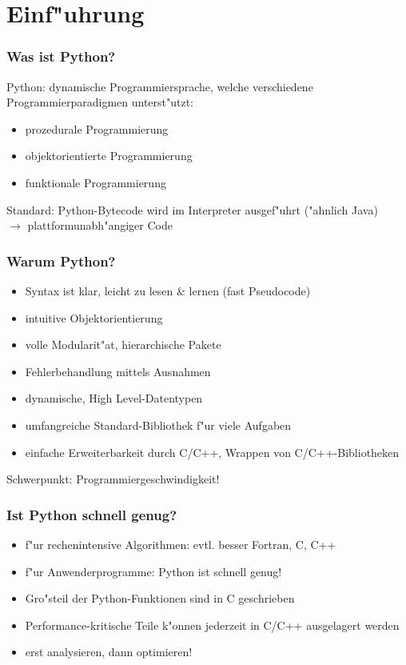 \section{Einf"uhrung}

\begin{frame}
\frametitle{Was ist Python?}
\alert{Python:} dynamische Programmiersprache, welche verschiedene Programmierparadigmen unterst"utzt:
\begin{itemize}
\item prozedurale Programmierung
\item objektorientierte Programmierung
\item funktionale Programmierung
\end{itemize}
Standard: Python-Bytecode wird im Interpreter ausgef"uhrt ("ahnlich Java)\\
$\rightarrow$ \alert{plattformunabh"angiger Code}
\end{frame}

\begin{frame}
\frametitle{Warum Python?}
\begin{itemize}
\item Syntax ist klar, leicht zu lesen \& lernen (fast Pseudocode)
\item intuitive Objektorientierung
\item volle Modularit"at, hierarchische Pakete
\item Fehlerbehandlung mittels Ausnahmen
\item dynamische, \glqq High Level\grqq-Datentypen
\item umfangreiche Standard-Bibliothek f"ur viele Aufgaben
\item einfache Erweiterbarkeit durch C/C++, Wrappen von C/C++-Bibliotheken
\end{itemize}
\alert{Schwerpunkt: Programmiergeschwindigkeit!}
\end{frame}

\begin{frame}
\frametitle{Ist Python schnell genug?}
\begin{itemize}
\item f"ur rechenintensive Algorithmen: evtl. besser Fortran, C, C++ 
\item f"ur Anwenderprogramme: Python ist schnell genug!
\item Gro"steil der Python-Funktionen sind in C geschrieben
\item Performance-kritische Teile k"onnen jederzeit in C/C++ ausgelagert werden
\item erst analysieren, dann optimieren!
\end{itemize}
\end{frame}

